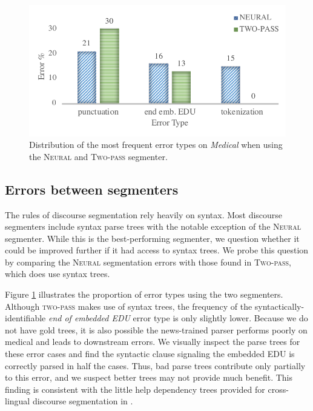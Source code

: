\begin{figure}
    \centering
    \includegraphics[scale=0.5]{plots/anno_errors_feng.pdf}
    \vspace{-1.2em}
    \caption{Distribution of the most frequent error types on \textit{Medical} when using the \textsc{Neural} and \textsc{Two-pass} segmenter.}
    \label{fig:errors_syntax}
\end{figure}

\subsection{Errors between segmenters}
\label{sec:errors_segmenters}
The rules of discourse segmentation rely heavily on syntax. Most discourse segmenters include syntax parse trees with the notable exception of the \textsc{Neural} segmenter. While this is the best-performing segmenter, we question whether it could be improved further if it had access to syntax trees. We probe this question by comparing the \textsc{Neural} segmentation errors with those found in \textsc{Two-pass}, which does use syntax trees. 

Figure \ref{fig:errors_syntax} illustrates the proportion of error types using the two segmenters. Although \textsc{two-pass} makes use of syntax trees, the frequency of the syntactically-identifiable \textit{end of embedded EDU} error type is only slightly lower. Because we do not have gold trees, it is also possible the news-trained parser performs poorly on medical and leads to downstream errors. We visually inspect the parse trees for these error cases and find the syntactic clause signaling the embedded EDU is correctly parsed in half the cases. Thus, bad parse trees contribute only partially to this error, and we suspect better trees may not provide much benefit. This finding is consistent with the little help dependency trees provided for cross-lingual discourse segmentation in .

